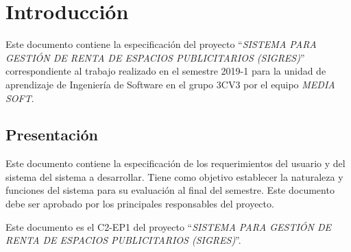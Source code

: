 \chapter{Introducción}


	Este documento contiene la especificación del proyecto ``{\em SISTEMA PARA GESTIÓN DE RENTA DE ESPACIOS PUBLICITARIOS (SIGRES)}'' correspondiente al trabajo realizado en el semestre 2019-1 para la unidad de aprendizaje de Ingeniería de Software en el grupo 3CV3 por el equipo {\em MEDIA SOFT}.

\section{Presentación}

	Este documento contiene la especificación de los requerimientos del usuario y del sistema del sistema a desarrollar. Tiene como objetivo establecer la naturaleza y funciones del sistema para su evaluación al final del semestre. Este documento debe ser aprobado por los principales responsables del proyecto.
	
	Este documento es el C2-EP1 del proyecto ``{\em SISTEMA PARA GESTIÓN DE RENTA DE ESPACIOS PUBLICITARIOS (SIGRES)}''.